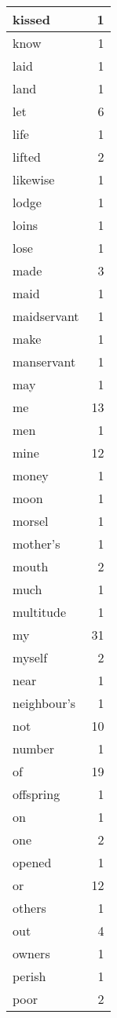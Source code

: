 \begin{center}
\begin{longtable}{l|r}
kissed & 1 \\ \hline
know & 1 \\ \hline
laid & 1 \\ \hline
land & 1 \\ \hline
let & 6 \\ \hline
life & 1 \\ \hline
lifted & 2 \\ \hline
likewise & 1 \\ \hline
lodge & 1 \\ \hline
loins & 1 \\ \hline
lose & 1 \\ \hline
made & 3 \\ \hline
maid & 1 \\ \hline
maidservant & 1 \\ \hline
make & 1 \\ \hline
manservant & 1 \\ \hline
may & 1 \\ \hline
me & 13 \\ \hline
men & 1 \\ \hline
mine & 12 \\ \hline
money & 1 \\ \hline
moon & 1 \\ \hline
morsel & 1 \\ \hline
mother's & 1 \\ \hline
mouth & 2 \\ \hline
much & 1 \\ \hline
multitude & 1 \\ \hline
my & 31 \\ \hline
myself & 2 \\ \hline
near & 1 \\ \hline
neighbour's & 1 \\ \hline
not & 10 \\ \hline
number & 1 \\ \hline
of & 19 \\ \hline
offspring & 1 \\ \hline
on & 1 \\ \hline
one & 2 \\ \hline
opened & 1 \\ \hline
or & 12 \\ \hline
others & 1 \\ \hline
out & 4 \\ \hline
owners & 1 \\ \hline
perish & 1 \\ \hline
poor & 2 \\ \hline

\end{longtable}
\end{center}

